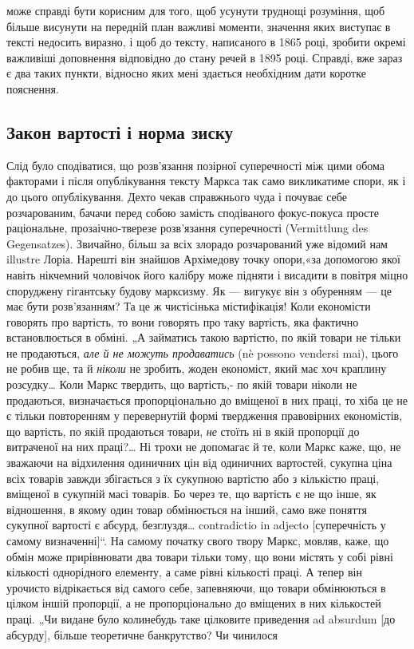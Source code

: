 \parcont{}  %
може справді бути корисним для того, щоб усунути труднощі розуміння, щоб більше висунути на
передній план важливі моменти, значення яких виступає в тексті недосить виразно, і щоб до
тексту, написаного в 1865 році, зробити окремі важливіші доповнення відповідно до стану речей в
1895 році. Справді, вже зараз є два таких пункти, відносно яких мені здається необхідним дати
коротке пояснення.

\subsection{Закон вартості і норма зиску}

Слід було сподіватися, що розв’язання позірної суперечності між цими обома факторами і після
опублікування тексту Маркса так само викликатиме спори, як і до цього опублікування. Дехто чекав
справжнього чуда і почуває себе розчарованим, бачачи перед собою замість сподіваного фокус-покуса
просте раціональне, прозаічно-тверезе розв’язання суперечності (Vermittlung
des Gegensatzes). Звичайно, більш за всіх злорадо розчарований уже відомий нам illustre Лоріа.
Нарешті він знайшов Архімедову точку опори,«за допомогою якої навіть нікчемний чоловічок його
калібру може підняти і висадити в повітря міцно споруджену гігантську будову марксизму. Як —
вигукує він з обуренням — це має бути розв’язанням? Та це ж чистісінька містифікація! Коли
економісти говорять про вартість, то вони говорять про таку вартість, яка фактично встановлюється
в обміні. „А займатись такою вартістю, по якій товари не тільки не продаються, \emph{але й не можуть
продаватись} (nè possono vendersi mai), цього не робив ще, та й \emph{ніколи} не зробить, жоден
економіст, який має хоч краплину розсудку\dots{} Коли Маркс твердить, що вартість,- по якій товари
ніколи не продаються, визначається пропорціонально до вміщеної в них праці, то хіба це не є тільки повторенням у
перевернутій формі твердження правовірних економістів, що вартість, по
якій продаються товари, \emph{не} стоїть ні в якій пропорції до витраченої на них праці?\dots{} Ні трохи не
допомагає й те, коли Маркс каже, що, не зважаючи
на відхилення одиничних цін від одиничних вартостей, сукупна ціна всіх товарів завжди збігається
з їх сукупною вартістю або з кількістю праці, вміщеної в сукупній масі товарів. Бо через те, що
вартість є не що інше, як відношення, в якому один товар обмінюється на інший, само вже поняття
сукупної вартості є абсурд, безглуздя\dots{} contradictio in adjecto [суперечність у самому визначенні]“. На самому
початку свого твору Маркс, мовляв, каже, що обмін може прирівнювати два товари
тільки тому, що вони містять у собі рівні кількості однорідного елементу, а саме рівні кількості
праці. А тепер він урочисто відрікається від самого себе, запевняючи, що товари обмінюються в
цілком іншій пропорції, а не
пропорціонально до вміщених в них кількостей праці. „Чи видане було колинебудь таке цілковите
приведення ad absurdum [до абсурду], більше теоретичне банкрутство? Чи чинилося
\parbreak{}  %
